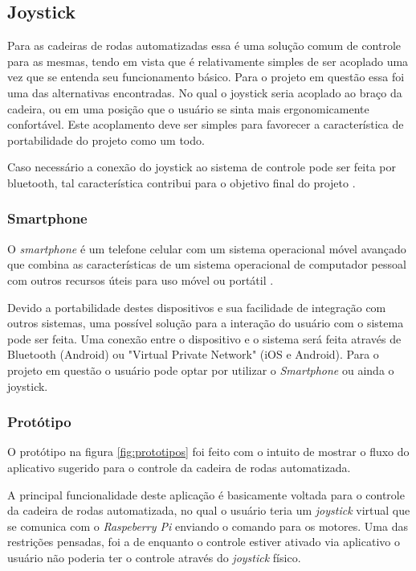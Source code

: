 \subsection{Joystick}
Para as cadeiras de rodas automatizadas essa é uma solução comum de controle para as mesmas, tendo em vista que é relativamente simples de ser acoplado uma vez que se entenda seu funcionamento básico. Para o projeto em questão essa foi uma das alternativas encontradas. No qual o joystick seria acoplado ao braço da cadeira, ou em uma posição que o usuário se sinta mais ergonomicamente confortável. Este acoplamento deve ser simples para favorecer a característica de portabilidade do projeto como um todo.

Caso necessário a conexão do joystick ao sistema de controle pode ser feita por bluetooth, tal característica contribui para o objetivo final do projeto \cite{artigo_joystick_controller}.

\subsubsection{Smartphone}
O \textit{smartphone} é um telefone celular com um sistema operacional móvel avançado que combina as características de um sistema operacional de computador pessoal com outros recursos úteis para uso móvel ou portátil \cite{article_smartphone}.

Devido a portabilidade destes dispositivos e sua facilidade de integração com outros sistemas, uma possível solução para a interação do usuário com o sistema pode ser feita. Uma conexão entre o dispositivo e o sistema será feita através de Bluetooth (Android) ou "Virtual Private Network" (iOS e Android). Para o projeto em questão o usuário pode optar por utilizar o \textit{Smartphone} ou ainda o joystick.

\subsubsection{Protótipo}

O protótipo na figura \ref{fig:prototipos} foi feito com o intuito de mostrar o fluxo do aplicativo sugerido para o controle da cadeira de rodas automatizada.

A principal funcionalidade deste aplicação é basicamente voltada para o controle da cadeira de rodas automatizada, no qual o usuário teria um \textit{joystick} virtual que se comunica com o \textit{Raspeberry Pi} enviando o comando para os motores.
Uma das restrições pensadas, foi a de enquanto o controle estiver ativado via aplicativo o usuário não poderia ter o controle através do \textit{joystick} físico.


